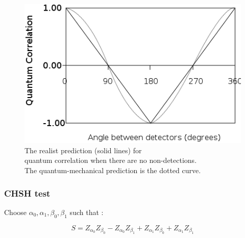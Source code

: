 \documentclass{article}
\begin{document}
\begin{figure}[h]
    \centering
    \captionsetup{justification=justified,margin=3cm}
    \includegraphics[scale=0.6]{lhv-correlation.png}
    \caption{\quad The realist prediction (solid lines) for\\quantum correlation
            when there are no non-detections.\\
            The quantum-mechanical prediction is the dotted curve.}
\end{figure}


\subsubsection*{CHSH test}
Choose $\alpha_0, \alpha_1, \beta_0, \beta_1$ such that :

\begin{equation}
    \label{def-s-lhv}
    S = Z_{\alpha_0}Z_{\beta_0}
        - Z_{\alpha_0}Z_{\beta_1}
        + Z_{\alpha_1}Z_{\beta_0}
        + Z_{\alpha_1}Z_{\beta_1}
\end{equation}
\end{document}
